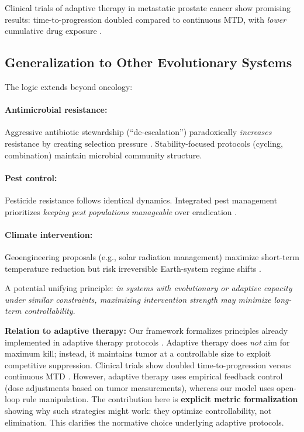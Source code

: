 \documentclass[11pt,a4paper]{article}
\begin{document}
Clinical trials of adaptive therapy in metastatic prostate cancer show promising results: time-to-progression doubled compared to continuous MTD, with \textit{lower} cumulative drug exposure \citep{zhang2017integrating}.

\subsection{Generalization to Other Evolutionary Systems}

The logic extends beyond oncology:

\paragraph{Antimicrobial resistance:} Aggressive antibiotic stewardship (``de-escalation'') paradoxically \textit{increases} resistance by creating selection pressure \citep{baym2016spatiotemporal}. Stability-focused protocols (cycling, combination) maintain microbial community structure.

\paragraph{Pest control:} Pesticide resistance follows identical dynamics. Integrated pest management prioritizes \textit{keeping pest populations manageable} over eradication \citep{tabashnik2008evolution}.

\paragraph{Climate intervention:} Geoengineering proposals (e.g., solar radiation management) maximize short-term temperature reduction but risk irreversible Earth-system regime shifts \citep{keith2017review}.

A potential unifying principle: \textit{in systems with evolutionary or adaptive capacity under similar constraints, maximizing intervention strength may minimize long-term controllability}.

\textbf{Relation to adaptive therapy:} Our framework formalizes principles already implemented in adaptive therapy protocols \citep{gatenby2009adaptive, zhang2017integrating}. Adaptive therapy does \textit{not} aim for maximum kill; instead, it maintains tumor at a controllable size to exploit competitive suppression. Clinical trials show doubled time-to-progression versus continuous MTD \citep{zhang2017integrating}. However, adaptive therapy uses empirical feedback control (dose adjustments based on tumor measurements), whereas our model uses open-loop rule manipulation. The contribution here is \textbf{explicit metric formalization} showing why such strategies might work: they optimize controllability, not elimination. This clarifies the normative choice underlying adaptive protocols.
\end{document}

